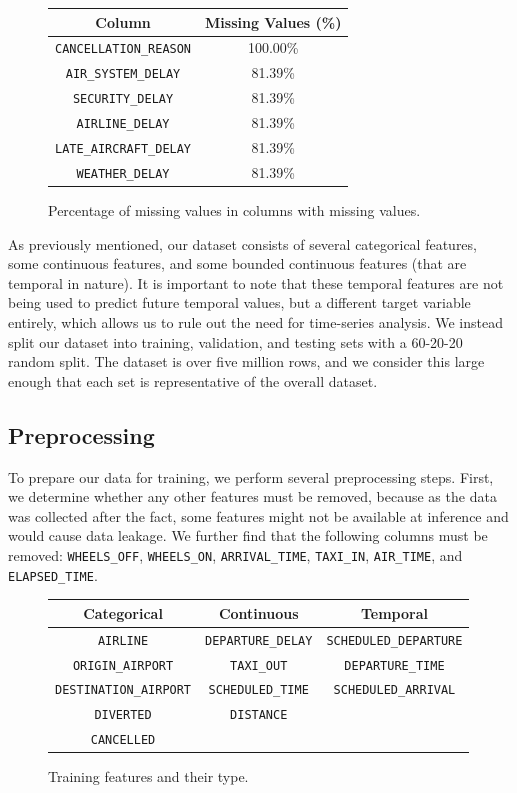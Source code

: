 \documentclass{chaistyle}
\begin{document}
\begin{figure}[h]
    \centering
    \begin{tabular}{c|c}
        Column & Missing Values (\%) \\
        \hline
        \texttt{CANCELLATION\_REASON} & 100.00\% \\
        \texttt{AIR\_SYSTEM\_DELAY} & 81.39\% \\
        \texttt{SECURITY\_DELAY} & 81.39\% \\
        \texttt{AIRLINE\_DELAY} & 81.39\% \\
        \texttt{LATE\_AIRCRAFT\_DELAY} & 81.39\% \\
        \texttt{WEATHER\_DELAY} & 81.39\%
    \end{tabular}
    \caption{Percentage of missing values in columns with missing values.}
    \label{fig:missingvalues}
\end{figure}

As previously mentioned, our dataset consists of several categorical features, some continuous features, and some bounded continuous features (that are temporal in nature). It is important to note that these temporal features are not being used to predict future temporal values, but a different target variable entirely, which allows us to rule out the need for time-series analysis. We instead split our dataset into training, validation, and testing sets with a 60-20-20 random split. The dataset is over five million rows, and we consider this large enough that each set is representative of the overall dataset.
\subsection{Preprocessing}
To prepare our data for training, we perform several preprocessing steps. First, we determine whether any other features must be removed, because as the data was collected after the fact, some features might not be available at inference and would cause data leakage. We further find that the following columns must be removed: \texttt{WHEELS\_OFF}, \texttt{WHEELS\_ON}, \texttt{ARRIVAL\_TIME}, \texttt{TAXI\_IN}, \texttt{AIR\_TIME}, and \texttt{ELAPSED\_TIME}. 

\begin{figure}[h]
    \centering
    \begin{tabular}{c|c|c}
        Categorical & Continuous & Temporal \\ 
        \hline
        \texttt{AIRLINE} & \texttt{DEPARTURE\_DELAY} & \texttt{SCHEDULED\_DEPARTURE} \\ 
        \texttt{ORIGIN\_AIRPORT} & \texttt{TAXI\_OUT} & \texttt{DEPARTURE\_TIME} \\ 
        \texttt{DESTINATION\_AIRPORT} & \texttt{SCHEDULED\_TIME} & \texttt{SCHEDULED\_ARRIVAL} \\ 
        \texttt{DIVERTED} & \texttt{DISTANCE} \\ 
        \texttt{CANCELLED}
    \end{tabular}
    \caption{Training features and their type.}
    \label{fig:features}
\end{figure}
\end{document}
